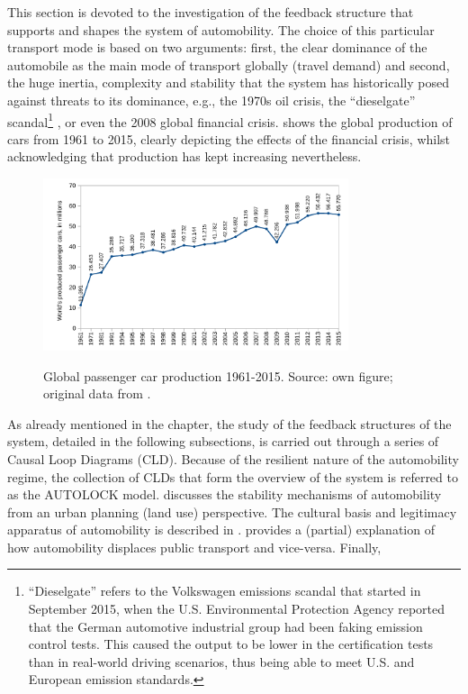 This section is devoted to the investigation of the feedback structure that supports and shapes the system of automobility. The choice of this particular transport mode is based on two arguments: first, the clear dominance of the automobile as the main mode of transport globally (travel demand) and second, the huge inertia, complexity and stability that the system has historically posed against threats to its dominance, e.g., the 1970s oil crisis, the ``dieselgate'' scandal\footnote{``Dieselgate'' refers to the Volkswagen emissions scandal that started in September 2015, when the U.S. Environmental Protection Agency reported that the German automotive industrial group had been faking emission control tests. This caused the  output to be lower in the certification tests than in real-world driving scenarios, thus being able to meet U.S. and European emission standards.} \parencite{guardian2017_Volkswagenrevealsrecord}, or even the 2008 global financial crisis.  shows the global production of cars from 1961 to 2015, clearly depicting the effects of the financial crisis, whilst acknowledging that production has kept increasing nevertheless.
%
\begin{figure}[h]
\centering
\includegraphics[width=0.8\textwidth]{figures/line_global-car-sales.pdf}
\label{f:results:global-passenger-car-production}
\caption[Global passenger cars production 1961-2015.]{Global passenger car production 1961-2015. Source: own figure; original data from \textcite{bts2017_Table123}.}
\end{figure}

As already mentioned in the  chapter, the study of the feedback structures of the system, detailed in the following subsections, is carried out through a series of Causal Loop Diagrams (CLD). Because of the resilient nature of the automobility regime, the collection of CLDs that form the overview of the system is referred to as the AUTOLOCK model.  discusses the stability mechanisms of automobility from an urban planning (land use) perspective. The cultural basis and legitimacy apparatus of automobility is described in .  provides a (partial) explanation of how automobility displaces public transport and vice-versa. Finally, 

